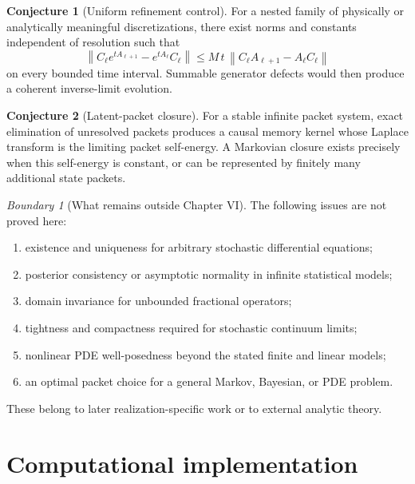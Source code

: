 \documentclass[11pt,letterpaper]{article}
\theoremstyle{plain}
\theoremstyle{plain}
\theoremstyle{plain}
\theoremstyle{definition}
\theoremstyle{definition}
\theoremstyle{definition}
\theoremstyle{definition}
\theoremstyle{definition}
\newtheorem{conjecture}[conjecture]{Conjecture}
\theoremstyle{remark}
\theoremstyle{remark}
\theoremstyle{remark}
\newtheorem{boundary}[boundary]{Boundary}
\theoremstyle{remark}
\theoremstyle{remark}
\newcommand{\norm}[1]{\left\lVert#1\right\rVert}
\theoremstyle{remark}
\begin{document}
\begin{conjecture}[Uniform refinement control]\label{core:record:048}
For a nested family of physically or analytically meaningful discretizations, there exist norms and constants independent of resolution such that
\[
\norm{C_\ell e^{tA_{\ell+1}}-e^{tA_\ell}C_\ell}
\le
M\,t\,\norm{C_\ell A_{\ell+1}-A_\ell C_\ell}
\]
on every bounded time interval. Summable generator defects would then produce a coherent inverse-limit evolution.
\end{conjecture}

\begin{conjecture}[Latent-packet closure]\label{core:record:049}
For a stable infinite packet system, exact elimination of unresolved packets produces a causal memory kernel whose Laplace transform is the limiting packet self-energy. A Markovian closure exists precisely when this self-energy is constant, or can be represented by finitely many additional state packets.
\end{conjecture}

\begin{boundary}[What remains outside Chapter VI]\label{core:record:050}
The following issues are not proved here:
\begin{enumerate}[leftmargin=2em]
\item existence and uniqueness for arbitrary stochastic differential equations;
\item posterior consistency or asymptotic normality in infinite statistical models;
\item domain invariance for unbounded fractional operators;
\item tightness and compactness required for stochastic continuum limits;
\item nonlinear PDE well-posedness beyond the stated finite and linear models;
\item an optimal packet choice for a general Markov, Bayesian, or PDE problem.
\end{enumerate}
These belong to later realization-specific work or to external analytic theory.
\end{boundary}

\FloatBarrier
\section{Computational implementation}\label{core:section:18}
\end{document}
